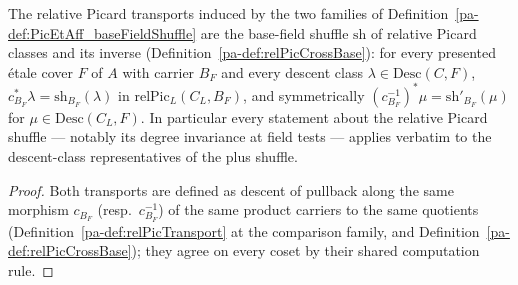 \begin{theorem}
  \label{pa-thm:PicEtAff_baseFieldShuffle_relPic}
  \leanok

  The relative Picard transports induced by the two families of
  Definition~\ref{pa-def:PicEtAff_baseFieldShuffle} are the base-field shuffle
  \(\mathrm{sh}\) of relative Picard classes and its inverse
  (Definition~\ref{pa-def:relPicCrossBase}): for every presented \'etale cover \(F\) of
  \(A\) with carrier \(B_F\) and every descent class
  \(\lambda \in \mathrm{Desc}(C, F)\),
  \(c_{B_F}^{*}\lambda = \mathrm{sh}_{B_F}(\lambda)\) in
  \(\mathrm{relPic}_L(C_L, B_F)\), and symmetrically
  \((c_{B_F}^{-1})^{*}\mu = \mathrm{sh}'_{B_F}(\mu)\) for
  \(\mu \in \mathrm{Desc}(C_L, F)\). In particular every statement about the relative
  Picard shuffle — notably its degree invariance at field tests — applies verbatim to
  the descent-class representatives of the plus shuffle.
\end{theorem}
\begin{proof}
  \leanok
  Both transports are defined as descent of pullback along the same morphism \(c_{B_F}\)
  (resp.\ \(c_{B_F}^{-1}\)) of the same product carriers to the same quotients
  (Definition~\ref{pa-def:relPicTransport} at the comparison family, and
  Definition~\ref{pa-def:relPicCrossBase}); they agree on every coset by their shared
  computation rule.
\end{proof}

